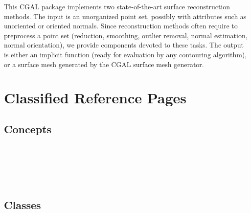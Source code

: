 


This CGAL package implements two state-of-the-art surface reconstruction methods.
The input is an unorganized point set, possibly with attributes such as unoriented or oriented normals.
Since reconstruction methods often require to preprocess a point set (reduction, smoothing,
outlier removal, normal estimation, normal orientation), we provide components devoted to these tasks.
The output is either an implicit function (ready for evaluation by any contouring algorithm),
or a surface mesh generated by the CGAL surface mesh generator.

\section{Classified Reference Pages}


\subsection{Concepts}

 \\
 \\
 \\
  \\


\subsection{Classes}

 \\
 \\
 \\
  \\
  \\


